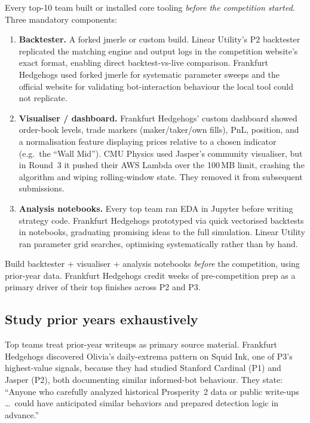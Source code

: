 Every top-10 team built or installed core tooling \emph{before
the competition started}.  Three mandatory components:

\begin{enumerate}
  \item \textbf{Backtester.}  A forked jmerle or custom build.
        Linear Utility's P2 backtester replicated the matching
        engine and output logs in the competition website's exact
        format, enabling direct backtest-vs-live comparison.
        Frankfurt Hedgehogs used forked jmerle for systematic
        parameter sweeps and the official website for validating
        bot-interaction behaviour the local tool could not
        replicate.

  \item \textbf{Visualiser / dashboard.}  Frankfurt Hedgehogs'
        custom dashboard showed order-book levels, trade markers
        (maker/taker/own fills), PnL, position, and a normalisation
        feature displaying prices relative to a chosen indicator
        (e.g.\ the ``Wall Mid'').  CMU Physics used Jasper's
        community visualiser, but in Round~3 it pushed their AWS
        Lambda over the 100\,MB limit, crashing the algorithm and
        wiping rolling-window state.  They removed it from
        subsequent submissions.

  \item \textbf{Analysis notebooks.}  Every top team ran EDA in
        Jupyter before writing strategy code.  Frankfurt Hedgehogs
        prototyped via quick vectorised backtests in notebooks,
        graduating promising ideas to the full simulation.  Linear
        Utility ran parameter grid searches, optimising
        systematically rather than by hand.
\end{enumerate}

\begin{keyfactbox}
Build backtester + visualiser + analysis notebooks \emph{before}
the competition, using prior-year data.  Frankfurt Hedgehogs
credit weeks of pre-competition prep as a primary driver of their
top finishes across P2 and P3.
\end{keyfactbox}

\subsection{Study prior years exhaustively}
\label{sec:study_prior}

Top teams treat prior-year writeups as primary source material.
Frankfurt Hedgehogs discovered Olivia's daily-extrema pattern on
Squid Ink, one of P3's highest-value signals, because they had
studied Stanford Cardinal (P1) and Jasper (P2), both documenting
similar informed-bot behaviour.  They state: ``Anyone who
carefully analyzed historical Prosperity~2 data or public
write-ups \ldots\ could have anticipated similar behaviors and
prepared detection logic in advance.''

